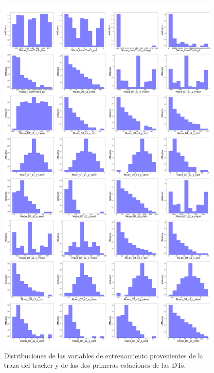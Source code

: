 \begin{figure}
\centering
\includegraphics[width=1.0\textwidth]{figures/Training_vars_2.png}
\caption{Distribuciones de las variables de entrenamiento provenientes de la traza del tracker y de las dos primeras estaciones de las DTs.}
\label{fig:train_vars}        
\end{figure}


\clearpage

